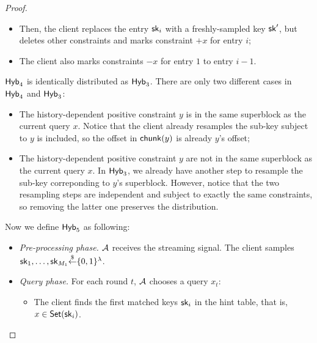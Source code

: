 \begin{proof}
\begin{itemize}
\begin{itemize}
            \item Then, the client replaces the entry $\mathsf{sk}_i$ with a freshly-sampled key $\mathsf{sk}'$, but deletes other constraints and marks constraint $+x$ for entry $i$;
            
            \item The client also marks constraints $-x$ for entry $1$ to entry $i-1$.
            
        \end{itemize}
        
    \end{itemize}
    
    
    ${\sf Hyb}_4$ is identically distributed as ${\sf Hyb}_3$. There are only two different cases in ${\sf Hyb}_4$ and ${\sf Hyb}_3$:
    
    \begin{itemize}
        
        \item The history-dependent positive constraint $y$ is in the same superblock as the current query $x$. 
        Notice that the client already resamples the sub-key subject to $y$ is included, so the offset in $\mathsf{chunk}(y)$ is already $y$'s offset;
        
        \item The history-dependent positive constraint $y$ are not in the same superblock as the current query $x$. In ${\sf Hyb}_3$, we already have another step to resample the sub-key correponding to $y$'s superblock. However, notice that the two resampling steps are independent and subject to exactly the same constraints, so removing the latter one preserves the distribution.
        
    \end{itemize}
    
    
    Now we define ${\sf Hyb}_5$ as following:
    
    \begin{itemize}
        \item \textit{Pre-processing phase.} $\mathcal{A}$ receives the streaming signal. The client samples $\mathsf{sk}_1,\dots,\mathsf{sk}_{M_1}{\overset{\$}{\leftarrow}}\{0,1\}^\lambda$. %
        \item \textit{Query phase.} For each round $t$, $\mathcal{A}$ chooses a query $x_t$:
        \begin{itemize}
            \item The client finds the first matched keys $\mathsf{sk}_i$ in the hint table, that is, $x\in\mathsf{Set}(\mathsf{sk}_i)$.
            

\end{itemize}
\end{itemize}
\end{proof}
